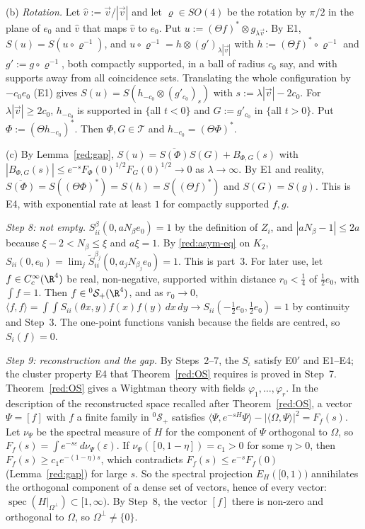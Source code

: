 (b) \emph{Rotation.} Let $\hat v:=\vec v/|\vec v|$ and let $\varrho\in SO(4)$ be the rotation by $\pi/2$ in the plane of $e_0$ and $\hat v$ that maps $\hat v$ to $e_0$. Put $u:=(\Theta f)^*\otimes g_{\lambda\vec v}$. By E1, $S(u)=S(u\circ\varrho^{-1})$, and $u\circ\varrho^{-1}=h\otimes(g')_{\lambda|\vec v|}$ with $h:=(\Theta f)^*\circ\varrho^{-1}$ and $g':=g\circ\varrho^{-1}$, both compactly supported, in a ball of radius $c_0$ say, and with supports away from all coincidence sets. Translating the whole configuration by $-c_0e_0$ (E1) gives $S(u)=S(h_{-c_0}\otimes(g'_{c_0})_{s})$ with $s:=\lambda|\vec v|-2c_0$. For $\lambda|\vec v|\ge2c_0$, $h_{-c_0}$ is supported in $\{$all $t<0\}$ and $G:=g'_{c_0}$ in $\{$all $t>0\}$. Put $\Phi:=(\Theta h_{-c_0})^*$. Then $\Phi,G\in\mathcal T$ and $h_{-c_0}=(\Theta\Phi)^*$.

(c) By Lemma~\ref{red:gap}, $S(u)=\overline{S(\Phi)}S(G)+B_{\Phi,G}(s)$ with $|B_{\Phi,G}(s)|\le e^{-s}F_\Phi(0)^{1/2}F_G(0)^{1/2}\to0$ as $\lambda\to\infty$. By E1 and reality, $\overline{S(\Phi)}=S((\Theta\Phi)^*)=S(h)=S((\Theta f)^*)$ and $S(G)=S(g)$. This is E4, with exponential rate at least $1$ for compactly supported $f,g$.

\emph{Step 8: not empty.} $S^\beta_{ii}(0,aN_\beta e_0)=1$ by the definition of $Z_i$, and $|aN_\beta-1|\le2a$ because $\xi-2<N_\beta\le\xi$ and $a\xi=1$. By \eqref{red:asym-eq} on $K_2$, $S_{ii}(0,e_0)=\lim_j\tilde S^{\beta_j}_{ii}(0,a_jN_{\beta_j}e_0)=1$. This is part~3. For later use, let $f\in C_c^\infty(\R^4)$ be real, non-negative, supported within distance $r_0<\tfrac14$ of $\tfrac12e_0$, with $\int f=1$. Then $f\in{}^0\mathcal S_+(\R^4)$, and as $r_0\to0$, $\langle f,f\rangle=\int\!\!\int S_{ii}(\theta x,y)f(x)f(y)\,dx\,dy\to S_{ii}(-\tfrac12e_0,\tfrac12e_0)=1$ by continuity and Step~3. The one-point functions vanish because the fields are centred, so $S_i(f)=0$.

\emph{Step 9: reconstruction and the gap.} By Steps~2--7, the $S_\iota$ satisfy E0$'$ and E1--E4; the cluster property E4 that Theorem~\ref{red:OS} requires is proved in Step~7. Theorem~\ref{red:OS} gives a Wightman theory with fields $\varphi_1,\dots,\varphi_r$. In the description of the reconstructed space recalled after Theorem~\ref{red:OS}, a vector $\Psi=[f]$ with $f$ a finite family in ${}^0\mathcal S_+$ satisfies $\langle\Psi,e^{-sH}\Psi\rangle-|\langle\Omega,\Psi\rangle|^2=F_f(s)$. Let $\nu_\Psi$ be the spectral measure of $H$ for the component of $\Psi$ orthogonal to $\Omega$, so $F_f(s)=\int e^{-s\varepsilon}\,d\nu_\Psi(\varepsilon)$. If $\nu_\Psi([0,1-\eta])=c_1>0$ for some $\eta>0$, then $F_f(s)\ge c_1e^{-(1-\eta)s}$, which contradicts $F_f(s)\le e^{-s}F_f(0)$ (Lemma~\ref{red:gap}) for large $s$. So the spectral projection $E_H([0,1))$ annihilates the orthogonal component of a dense set of vectors, hence of every vector: $\operatorname{spec}(H|_{\Omega^\perp})\subset[1,\infty)$. By Step~8, the vector $[f]$ there is non-zero and orthogonal to $\Omega$, so $\Omega^\perp\ne\{0\}$.

